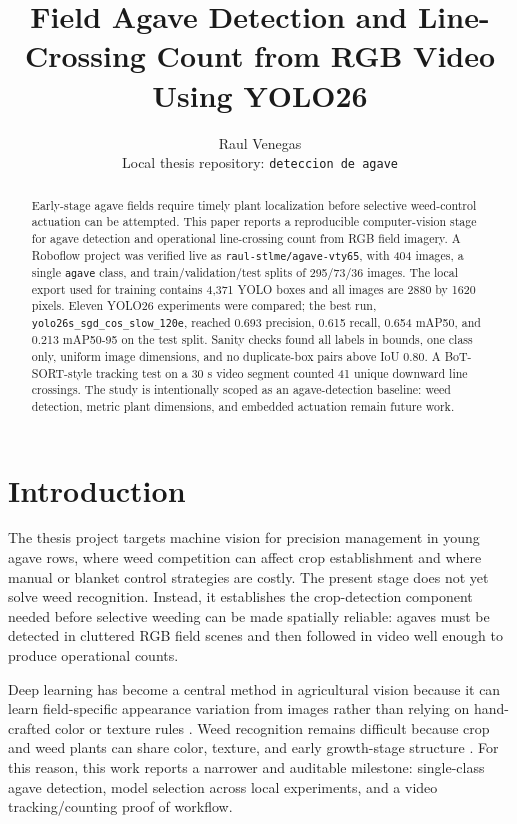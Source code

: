 \documentclass[10pt,twocolumn]{article}
\title{\vspace{-0.4in}Field Agave Detection and Line-Crossing Count from RGB Video Using YOLO26}
\author{Raul Venegas \\ Local thesis repository: \texttt{deteccion de agave}}
\date{}
\begin{document}
\maketitle

\begin{abstract}
Early-stage agave fields require timely plant localization before selective weed-control actuation can be attempted. This paper reports a reproducible computer-vision stage for agave detection and operational line-crossing count from RGB field imagery. A Roboflow project was verified live as \texttt{raul-stlme/agave-vty65}, with 404 images, a single \texttt{agave} class, and train/validation/test splits of 295/73/36 images. The local export used for training contains 4,371 YOLO boxes and all images are 2880 by 1620 pixels. Eleven YOLO26 experiments were compared; the best run, \texttt{yolo26s\_sgd\_cos\_slow\_120e}, reached 0.693 precision, 0.615 recall, 0.654 mAP50, and 0.213 mAP50-95 on the test split. Sanity checks found all labels in bounds, one class only, uniform image dimensions, and no duplicate-box pairs above IoU 0.80. A BoT-SORT-style tracking test on a 30 s video segment counted 41 unique downward line crossings. The study is intentionally scoped as an agave-detection baseline: weed detection, metric plant dimensions, and embedded actuation remain future work.
\end{abstract}

\section{Introduction}

The thesis project targets machine vision for precision management in young agave rows, where weed competition can affect crop establishment and where manual or blanket control strategies are costly. The present stage does not yet solve weed recognition. Instead, it establishes the crop-detection component needed before selective weeding can be made spatially reliable: agaves must be detected in cluttered RGB field scenes and then followed in video well enough to produce operational counts.

Deep learning has become a central method in agricultural vision because it can learn field-specific appearance variation from images rather than relying on hand-crafted color or texture rules \cite{kamilaris2018}. Weed recognition remains difficult because crop and weed plants can share color, texture, and early growth-stage structure \cite{hasan2021}. For this reason, this work reports a narrower and auditable milestone: single-class agave detection, model selection across local experiments, and a video tracking/counting proof of workflow.
\end{document}
